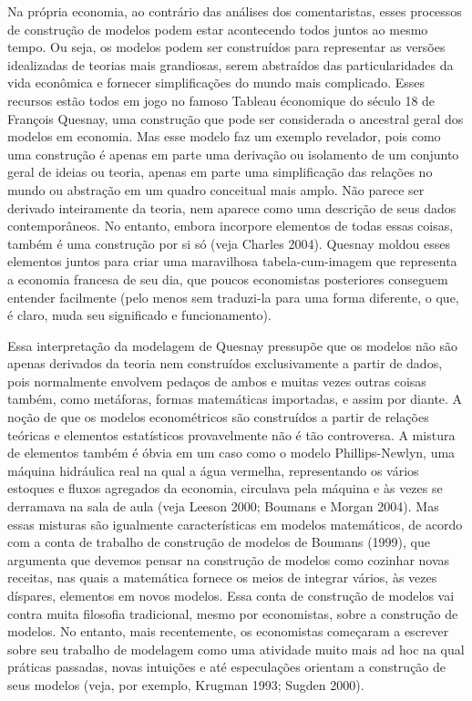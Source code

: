 \documentclass[a4paper,12pt]{article}[abntex2]
\begin{document}
Na própria economia, ao contrário das análises dos comentaristas, esses processos de construção de modelos podem estar acontecendo todos juntos ao mesmo tempo. Ou seja, os modelos podem ser construídos para representar as versões idealizadas de teorias mais grandiosas, serem abstraídos das particularidades da vida econômica e fornecer simplificações do mundo mais complicado. Esses recursos estão todos em jogo no famoso Tableau économique do século 18 de François Quesnay, uma construção que pode ser considerada o ancestral geral dos modelos em economia. Mas esse modelo faz um exemplo revelador, pois como uma construção é apenas em parte uma derivação ou isolamento de um conjunto geral de ideias ou teoria, apenas em parte uma simplificação das relações no mundo ou abstração em um quadro conceitual mais amplo. Não parece ser derivado inteiramente da teoria, nem aparece como uma descrição de seus dados contemporâneos. No entanto, embora incorpore elementos de todas essas coisas, também é uma construção por si só (veja Charles 2004). Quesnay moldou esses elementos juntos para criar uma maravilhosa tabela-cum-imagem que representa a economia francesa de seu dia, que poucos economistas posteriores conseguem entender facilmente (pelo menos sem traduzi-la para uma forma diferente, o que, é claro, muda seu significado e funcionamento).

Essa interpretação da modelagem de Quesnay pressupõe que os modelos não são apenas derivados da teoria nem construídos exclusivamente a partir de dados, pois normalmente envolvem pedaços de ambos e muitas vezes outras coisas também, como metáforas, formas matemáticas importadas, e assim por diante. A noção de que os modelos econométricos são construídos a partir de relações teóricas e elementos estatísticos provavelmente não é tão controversa. A mistura de elementos também é óbvia em um caso como o modelo Phillips-Newlyn, uma máquina hidráulica real na qual a água vermelha, representando os vários estoques e fluxos agregados da economia, circulava pela máquina e às vezes se derramava na sala de aula (veja Leeson 2000; Boumans e Morgan 2004). Mas essas misturas são igualmente características em modelos matemáticos, de acordo com a conta de trabalho de construção de modelos de Boumans (1999), que argumenta que devemos pensar na construção de modelos como cozinhar novas receitas, nas quais a matemática fornece os meios de integrar vários, às vezes díspares, elementos em novos modelos. Essa conta de construção de modelos vai contra muita filosofia tradicional, mesmo por economistas, sobre a construção de modelos. No entanto, mais recentemente, os economistas começaram a escrever sobre seu trabalho de modelagem como uma atividade muito mais ad hoc na qual práticas passadas, novas intuições e até especulações orientam a construção de seus modelos (veja, por exemplo, Krugman 1993; Sugden 2000).
\end{document}
